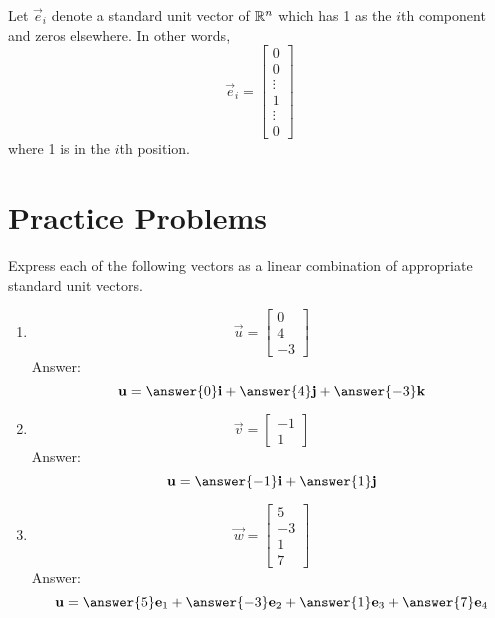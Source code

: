 \documentclass{ximera}
\begin{document}
  \begin{definition} 
  
  Let $\vec{e}_i$ denote a standard unit vector of $\mathbb{R}^n$ which has 1 as the $i$th component and zeros elsewhere.  In other words, $$\vec{e}_i=\begin{bmatrix}
0\\
0\\
\vdots\\
1\\
\vdots\\
0
\end{bmatrix}$$ 
  where 1 is in the $i$th position.
\end{definition}


\section*{Practice Problems}
\begin{problem}
Express each of the following vectors as a linear combination of appropriate standard unit vectors.
  \begin{enumerate}
  \item 
  $$\vec{u}=\begin{bmatrix}
0\\
4\\
-3
\end{bmatrix}$$
Answer:
$$\vec{u}=\answer{0}\vec{i}+\answer{4}\vec{j}+\answer{-3}\vec{k}$$

\item 
$$\vec{v}=\begin{bmatrix}
-1\\
1
\end{bmatrix}$$
Answer:
$$\vec{u}=\answer{-1}\vec{i}+\answer{1}\vec{j}$$
\item 
$$\vec{w}=\begin{bmatrix}
5\\
-3\\
1\\
7
\end{bmatrix}$$
Answer:
$$\vec{u}=\answer{5}\vec{e}_1+\answer{-3}\vec{e}_2+\answer{1}\vec{e}_3+\answer{7}\vec{e}_4$$
  \end{enumerate}
\end{problem}
\end{document}

